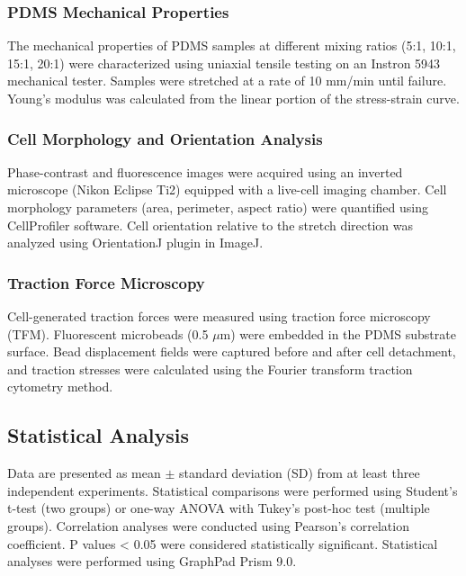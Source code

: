 \documentclass[materials,article,submit,moreauthors,pdftex]{Definitions/mdpi}
\begin{document}
\subsubsection{PDMS Mechanical Properties}

The mechanical properties of PDMS samples at different mixing ratios (5:1, 10:1, 15:1, 20:1) were characterized using uniaxial tensile testing on an Instron 5943 mechanical tester. Samples were stretched at a rate of 10 mm/min until failure. Young's modulus was calculated from the linear portion of the stress-strain curve.

\subsubsection{Cell Morphology and Orientation Analysis}

Phase-contrast and fluorescence images were acquired using an inverted microscope (Nikon Eclipse Ti2) equipped with a live-cell imaging chamber. Cell morphology parameters (area, perimeter, aspect ratio) were quantified using CellProfiler software. Cell orientation relative to the stretch direction was analyzed using OrientationJ plugin in ImageJ.

\subsubsection{Traction Force Microscopy}

Cell-generated traction forces were measured using traction force microscopy (TFM). Fluorescent microbeads (0.5 $\mu$m) were embedded in the PDMS substrate surface. Bead displacement fields were captured before and after cell detachment, and traction stresses were calculated using the Fourier transform traction cytometry method.

\subsection{Statistical Analysis}

Data are presented as mean $\pm$ standard deviation (SD) from at least three independent experiments. Statistical comparisons were performed using Student's t-test (two groups) or one-way ANOVA with Tukey's post-hoc test (multiple groups). Correlation analyses were conducted using Pearson's correlation coefficient. P values < 0.05 were considered statistically significant. Statistical analyses were performed using GraphPad Prism 9.0.

\end{document}
